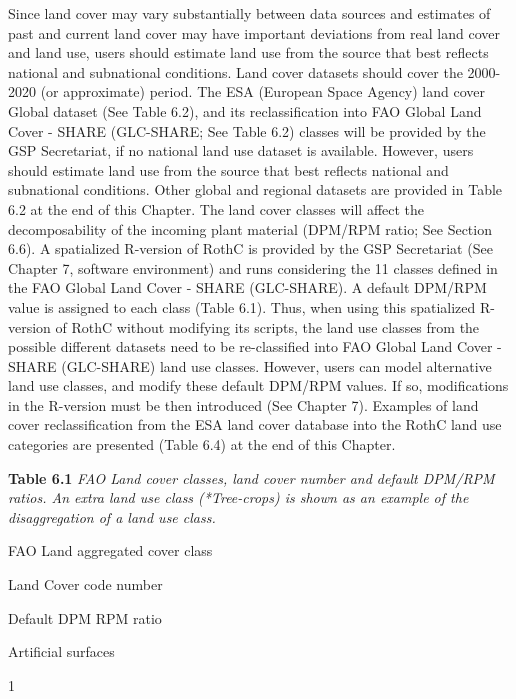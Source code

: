 \documentclass[
  10pt,
  b5paper,
]{book}
\begin{document}
Since land cover may vary substantially between data sources and estimates of past and current land cover may have important deviations from real land cover and land use, users should estimate land use from the source that best reflects national and subnational conditions. Land cover datasets should cover the 2000-2020 (or approximate) period.
The ESA (European Space Agency) land cover Global dataset (See Table 6.2), and its reclassification into FAO Global Land Cover - SHARE (GLC-SHARE; See Table 6.2) classes will be provided by the GSP Secretariat, if no national land use dataset is available. However, users should estimate land use from the source that best reflects national and subnational conditions. Other global and regional datasets are provided in Table 6.2 at the end of this Chapter.
The land cover classes will affect the decomposability of the incoming plant material (DPM/RPM ratio; See Section 6.6). A spatialized R-version of RothC is provided by the GSP Secretariat (See Chapter 7, software environment) and runs considering the 11 classes defined in the FAO Global Land Cover - SHARE (GLC-SHARE). A default DPM/RPM value is assigned to each class (Table 6.1). Thus, when using this spatialized R-version of RothC without modifying its scripts, the land use classes from the possible different datasets need to be re-classified into FAO Global Land Cover - SHARE (GLC-SHARE) land use classes. However, users can model alternative land use classes, and modify these default DPM/RPM values. If so, modifications in the R-version must be then introduced (See Chapter 7). Examples of land cover reclassification from the ESA land cover database into the RothC land use categories are presented (Table 6.4) at the end of this Chapter.

\textbf{Table 6.1} \emph{FAO Land cover classes, land cover number and default DPM/RPM ratios. An extra land use class (*Tree-crops) is shown as an example of the disaggregation of a land use class.}

FAO Land aggregated cover class

Land Cover code number

Default DPM RPM ratio

Artificial surfaces

1
\end{document}
